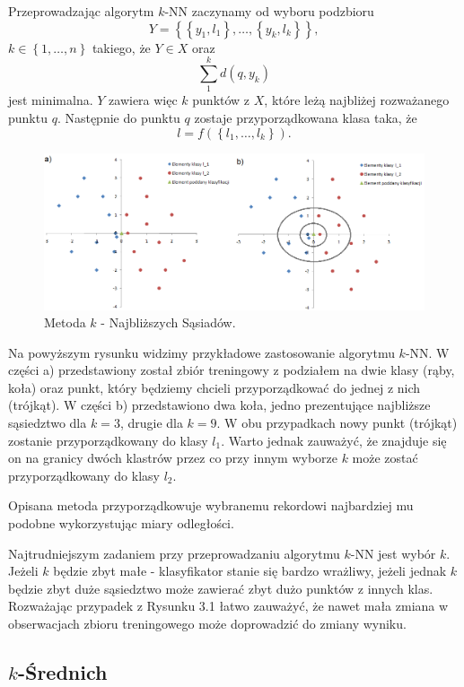 \documentclass[12pt,a4paper]{report}
\newcommand{\set}[1]{\left\lbrace {#1} \right\rbrace}
\begin{document}
Przeprowadzając algorytm $k$-NN zaczynamy od wyboru podzbioru
$$
Y=\set{\set{y_1,l_1},\ldots,\set{y_k,l_k}}, 
$$
$k\in\set{1,\ldots,n}$ takiego, że $Y \in X$ oraz $$\sum_1^k d(q,y_k)$$ jest minimalna. $Y$ zawiera więc $k$ punktów z $X$, które leżą najbliżej rozważanego punktu $q$. Następnie do punktu $q$ zostaje przyporządkowana klasa taka, że $$
l=f(\set{l_1,\ldots,l_k}).
$$
\begin{center}
\begin{figure}[H]
\centering
\includegraphics[scale=0.5]{kNN.PNG} 
\caption{Metoda $k$ - Najbliższych Sąsiadów.}
\end{figure}
\end{center}

Na powyższym rysunku widzimy przykładowe zastosowanie algorytmu $k$-NN. W części a) przedstawiony został zbiór treningowy z podziałem na dwie klasy (rąby, koła) oraz punkt, który będziemy chcieli przyporządkować do jednej z nich (trójkąt). W części b) przedstawiono dwa koła, jedno prezentujące najbliższe sąsiedztwo dla $k = 3$, drugie dla $k = 9$. W obu przypadkach nowy punkt (trójkąt) zostanie przyporządkowany do klasy $l_1$. Warto jednak zauważyć, że znajduje się on na granicy dwóch klastrów przez co przy innym wyborze $k$ może zostać przyporządkowany do klasy $l_2$.

Opisana metoda przyporządkowuje wybranemu rekordowi najbardziej mu podobne wykorzystując miary odległości.

Najtrudniejszym zadaniem przy przeprowadzaniu algorytmu $k$-NN jest wybór $k$. Jeżeli $k$ będzie zbyt małe - klasyfikator stanie się bardzo wrażliwy, jeżeli jednak $k$ będzie zbyt duże sąsiedztwo może zawierać zbyt dużo punktów z innych klas. Rozważając przypadek z Rysunku 3.1 łatwo zauważyć, że nawet mała zmiana w obserwacjach zbioru treningowego może doprowadzić do zmiany wyniku.

\subsection{$k$-Średnich } {\citep[Sec 2.3.1]{ascgdpds}}
\end{document}
